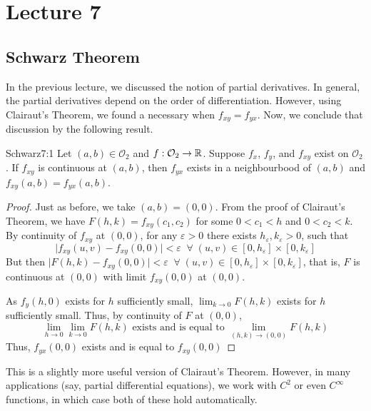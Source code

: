 \documentclass[../Analysis-3.tex]{subfiles}
\begin{document}
\chapter*{Lecture 7} %
\setcounter{chapter}{7} %
\setcounter{section}{0}



\section{Schwarz Theorem}

In the previous lecture, we discussed the notion of partial derivatives. In general, the partial derivatives depend on the order of differentiation. However, using Clairaut's Theorem, we found a necessary when $f_{xy} = f_{yx}$. Now, we conclude that discussion by the following result.

\begin{Thm}{Schwarz}{7:1}
  Let $(a,b) \in \mathcal{O}_2$ and $f:\mathcal{O}_2 \to \mathbb{R}$. Suppose $f_x$, $f_y$, and $f_{xy}$ exist on $\mathcal{O}_2$. If $f_{xy}$ is continuous at $(a,b)$, then $f_{yx}$ exists in a neighbourbood of $(a,b)$ and $f_{xy}(a,b) = f_{yx}(a,b)$.
\end{Thm}

\begin{proof}
  Just as before, we take $(a,b) = (0,0)$. From the proof of Clairaut's Theorem, we have $F(h,k) = f_{xy}(c_1, c_2)$ for some $0 < c_1< h$ and $0 < c_2 < k$. By continuity of $f_{xy}$ at $(0,0)$, for any $\varepsilon >0$ there exists $h_\varepsilon, k_\varepsilon > 0$, such that
  \[
    \mid f_{xy}(u,v)- f_{xy}(0,0)\mid < \varepsilon \;\;\forall \; (u,v) \in [0,h_\varepsilon]\times[0,k_\varepsilon]
  \]
  But then $\mid F(h,k) - f_{xy}(0,0) \mid < \varepsilon \;\;\forall \; (u,v) \in [0,h_\varepsilon]\times[0,k_\varepsilon]$, that is, $F$ is continuous at $(0,0)$ with limit $f_{xy}(0,0)$ at $(0,0)$.

  As $f_y(h,0)$ exists for $h$ sufficiently small, $\lim_{k \to 0} F(h,k)$ exists for $h$ sufficiently small. Thus, by continuity of $F$ at $(0,0)$,
  \[\lim_{h \to 0}\lim_{k \to 0} F(h,k) \text{  exists and is equal to  }\lim_{(h,k) \to (0,0)} F(h,k)\]
  Thus, $f_{yx}(0,0)$ exists and is equal to $f_{xy}(0,0)$
\end{proof}

\vspace{.2 cm}

This is a slightly more useful version of Clairaut's Theorem. However, in many applications (say, partial differential equations), we work with $C^2$ or even $C^\infty$ functions, in which case both of these hold automatically.
\vspace{.2 cm}
\end{document}
